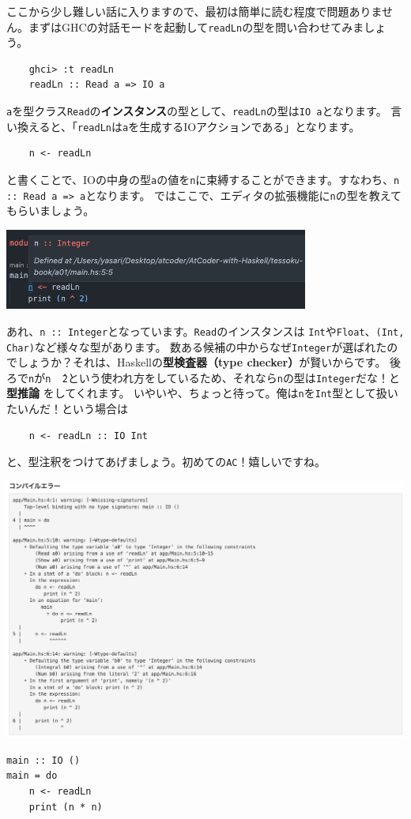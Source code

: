 \begin{ans*}
ここから少し難しい話に入りますので、最初は簡単に読む程度で問題ありません。まずはGHCの対話モードを起動して\texttt{readLn}の型を問い合わせてみましょう。
\begin{verbatim}
    ghci> :t readLn
    readLn :: Read a => IO a
\end{verbatim}
\texttt{a}を型クラス\texttt{Read}の{\bf インスタンス}の型として、\texttt{readLn}の型は\texttt{IO a}となります。
言い換えると、「\texttt{readLn}は\texttt{a}を生成するIOアクションである」となります。
\begin{verbatim}
    n <- readLn
\end{verbatim}
と書くことで、IOの中身の型\texttt{a}の値を\texttt{n}に束縛することができます。すなわち、\texttt{n :: Read a => a}となります。
ではここで、エディタの拡張機能に\texttt{n}の型を教えてもらいましょう。
\begin{center}
    \includegraphics[width=10cm]{./src/img/a01-1.png}
\end{center}
あれ、\texttt{n :: Integer}となっています。\texttt{Read}のインスタンスは
\texttt{Int}や\texttt{Float}、\texttt{(Int, Char)}など様々な型があります。
数ある候補の中からなぜ\texttt{Integer}が選ばれたのでしょうか？それは、Haskellの{\bf 型検査器（type checker）}が賢いからです。
後ろで\texttt{n}が\texttt{n \^ \ 2}という使われ方をしているため、それなら\texttt{n}の型は\texttt{Integer}だな！と{\bf 型推論}
をしてくれます。
いやいや、ちょっと待って。俺は\texttt{n}を\texttt{Int}型として扱いたいんだ！という場合は
\begin{verbatim}
    n <- readLn :: IO Int
\end{verbatim}
と、型注釈をつけてあげましょう。初めての\texttt{AC}！嬉しいですね。
\begin{center}
    \includegraphics[width=15cm]{./src/img/a01-2.png}
\end{center}
\end{ans*}

\begin{pro*}
\noindent
\begin{lstlisting}[caption={問題A01 The First Problem},label=A01,frame={tb}]
main :: IO ()
main = do
    n <- readLn
    print (n * n)
\end{lstlisting}
\end{pro*}
